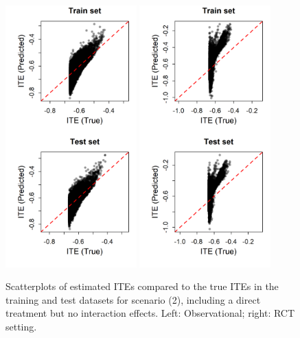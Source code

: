 \begin{figure}[htbp]
\centering
\includegraphics[width=0.45\textwidth]{img/results/observ_scenario2_ITE_scatter_train_test.png}
\includegraphics[width=0.45\textwidth]{img/results/rct_scenario2_ITE_scatter_train_test.png}
\caption{Scatterplots of estimated ITEs compared to the true ITEs in the training and test datasets for scenario (2), including a direct treatment but no interaction effects. Left: Observational; right: RCT setting.}
\label{fig:scenario2_ite_scatter_train_test}
\end{figure}




